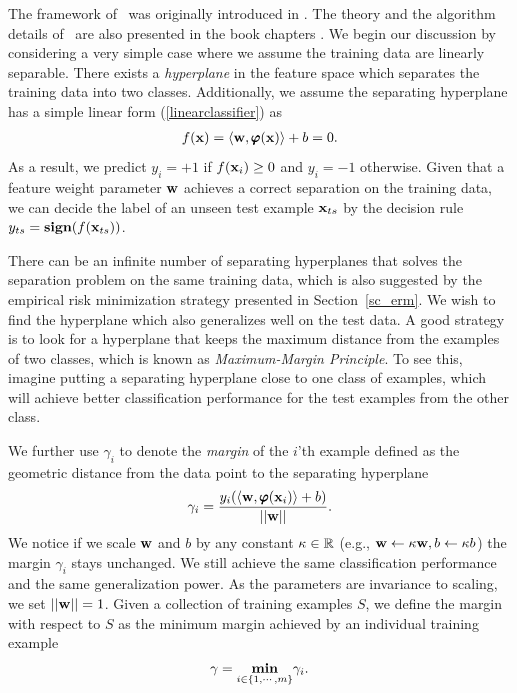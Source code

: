 {The framework of \svm\ was originally introduced in \citep{Cortes95support}.
The theory and the algorithm details of \svm\ are also presented in the book chapters \citep{Scholkopf02learning,taylor04,Bishop07}.
We begin our discussion by considering a very simple case where we assume the training data are linearly separable.
There exists a \textit{hyperplane} in the feature space which separates the training data into two classes.
Additionally, we assume the {separating hyperplane} has a simple linear form (\ref{linearclassifier}) as
\begin{align*}
	f(\mathbf {x})=\langle \mathbf {w}, \pmb \varphi(\mathbf {x}) \rangle + b = 0.
\end{align*}
As a result, we predict $y_i=+1$ if $f(\mathbf {x}_i)\ge0$ and $y_i=-1$ otherwise.
Given that a feature weight parameter $\mathbf {w}$ achieves a correct separation on the training data, we can decide the label of an unseen test example $\mathbf {x}_{ts}$ by the decision rule $y_{ts}=\textbf{sign}(f(\mathbf {x}_{ts}))$.

There can be an infinite number of separating hyperplanes that solves the separation problem on the same training data, which is also suggested by the empirical risk minimization strategy presented in Section~\ref{sc_erm}. 
We wish to find the hyperplane which also generalizes well on the test data.
A good strategy is to look for a hyperplane that keeps the maximum distance from the examples of two classes, which is known as \textit{Maximum-Margin Principle}.
To see this, imagine putting a separating hyperplane close to one class of examples, which will achieve better classification performance for the test examples from the other class.

We further use $\gamma_i$ to denote the \textit{margin} of the $i$'th example defined as the geometric distance from the data point to the separating hyperplane
\begin{align*}
	\gamma_i = \frac{y_i(\langle \mathbf {w}, \pmb \varphi(\mathbf {x}_i) \rangle+b)}{\left|\left| \mathbf {w} \right|\right|}.
\end{align*}
We notice if we scale $\mathbf {w}$ and $b$ by any constant $\kappa\in\mathbb{R}$ (e.g., $\mathbf {w}\leftarrow\kappa\mathbf {w}, b\leftarrow\kappa b$) the margin $\gamma_i$ stays unchanged. 
We still achieve the same classification performance and the same generalization power.
As the parameters are invariance to scaling, we set $\left|\left| \mathbf {w} \right|\right|=1$.
Given a collection of training examples $S$, we define the margin with respect to $S$ as the minimum margin achieved by an individual training example
\begin{align*}
	\gamma = \underset{i\in\{1,\cdots,m\}}{\textbf{min}}\gamma_i.
\end{align*}

}
